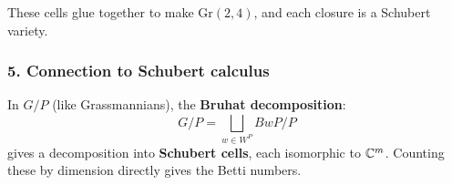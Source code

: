 \documentclass{amsart}
\let\originalmathbb\mathbb
\renewcommand{\mathbb}[1]{%
    \ifstrequal{#1}{1}{\mathbbm{#1}}{\originalmathbb{#1}}%
}
\theoremstyle{plain}
\theoremstyle{definition}
\theoremstyle{remark}
\begin{document}
These cells glue together to make $\mathrm{Gr}(2,4)$, and each closure is a Schubert variety.

\subsubsection{5. \textbf{Connection to Schubert calculus}}

In $G/P$ (like Grassmannians), the \textbf{Bruhat decomposition}:
\[
G/P = \bigsqcup_{w \in W^P} BwP/P
\]
gives a decomposition into \textbf{Schubert cells}, each isomorphic to $\mathbb{C}^m$. Counting these by dimension directly gives the Betti numbers.
\end{document}

